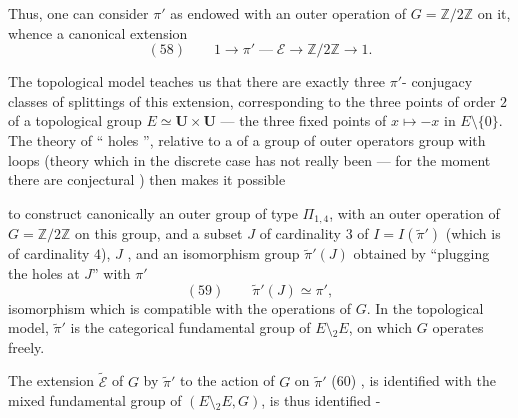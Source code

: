 Thus, one can consider $\pi'$ as endowed 
with an  outer operation of
$G=\mathbb Z/2\mathbb Z$ on it, whence a
canonical extension
\[
(58)\qquad 1\longrightarrow\pi'\mathrel{\text{---}}\mathcal E\longrightarrow\mathbb Z/2\mathbb Z\longrightarrow1.
\]

The topological model teaches us
that there are exactly three $\pi'$-
conjugacy classes of splittings of this
extension, corresponding to the three
points of order $2$ of a topological group
$E\simeq\mathbf U\times\mathbf U$ --- the three fixed points of
$x\mapsto-x$ in $E\setminus\{0\}$. The theory of
`` holes '', relative to a
 of a  group of outer operators
 group with loops (theory which
 in the discrete case has not really
been  --- for the moment there are
conjectural ) then makes it possible


to construct canonically an outer group  of type $\Pi_{1,4}$, with an outer operation of $G=\mathbb Z/2\mathbb Z$ on this group, and a subset $J$  of cardinality $3$ of $I=I(\widetilde{\pi}')$ (which is of cardinality $4$), $J$ , and an isomorphism  group $\widetilde{\pi}'(J)$  obtained by ``plugging the holes at $J$'' with $\pi'$
\[
(59)\qquad \widetilde{\pi}'(J)\simeq\pi',
\]
isomorphism which is compatible with the operations of $G$. In the topological model, $\widetilde{\pi}'$ is the categorical fundamental group of  $E\setminus {}_2E$,  on which $G$ operates freely.


The extension $\widetilde{\mathcal E}$ of $G$ by $\widetilde{\pi}'$  to the action of  $G$ on $\widetilde{\pi}'$
\noindent (60)\quad
{},
 is identified  with the mixed fundamental group of $(E\setminus {}_2E,G)$, is thus identified -

